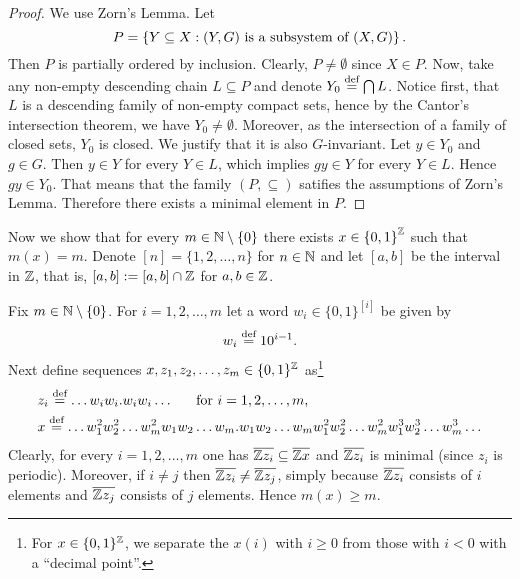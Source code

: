 \begin{proof}
We use Zorn's Lemma. Let $$P=\left\{Y\subseteq X: (Y,G) \text{ is a subsystem of } (X,G)\right\}.$$ Then $P$ is partially ordered by inclusion. Clearly, $P\neq\emptyset$ since $X\in P$. Now, take any non-empty descending chain $L\subseteq P$ and denote $Y_0\stackrel{\textup{def}}{=} \bigcap L$. Notice first, that $L$ is a descending family of non-empty compact sets, hence by the Cantor's intersection theorem, we have $Y_0\neq\emptyset$. Moreover, as the intersection of a family of closed sets, $Y_0$ is closed. We justify that it is also $G$-invariant. Let $y\in Y_0$ and $g\in G$. Then $y\in Y$ for every $Y\in L$, which implies $gy\in Y$ for every $Y\in L$. Hence $gy\in Y_0$.  That means that the family $(P,\subseteq)$ satifies the assumptions of Zorn's Lemma. Therefore there exists a minimal element in $P$.
\end{proof}



Now we show that for every $m\in \mathbb{N}\setminus\{0\}$ there exists $x\in \left\{0,1\right\}^{\mathbb{Z}}$ such that $m(x)=m$. Denote $[n]=\{1,2,\ldots,n\}$ for $n\in\mathbb{N}$ and let $[a,b]$ be the interval in $\mathbb{Z}$, that is, $[a,b]:=[a,b]\cap\mathbb{Z}$ for $a,b\in\mathbb{Z}$.  

Fix $m\in \mathbb{N}\setminus\{0\}$. 
For $i=1,2,\ldots,m$ let a word $w_i\in \{0,1\}^{[i]}$ be given by 
\[
w_i \stackrel{\textup{def}}{=} 10^{i-1}.
\]
Next define sequences $x,z_1,z_2,\ldots,z_m \in\{0,1\}^{\mathbb{Z}}$ as\footnote{For $x\in\{0,1\}^{\mathbb{Z}}$,  we separate the $x(i)$ with $i\geq 0$ from those with $i<0$ with a ``decimal point''.}
\begin{align*}
& z_i\stackrel{\textup{def}}{=} \ldots w_iw_i.w_iw_i\ldots  ~~~~\text{ for } i=1,2,\ldots,m, \\
& x\stackrel{\textup{def}}{=} \ldots w_1^2w_2^2\ldots w_m^2 w_1 w_2 \ldots w_m.w_1 w_2 \ldots w_m w_1^2w_2^2\ldots w_m^2 w_1^3 w_2^3 \ldots w_m^3 \ldots
\end{align*}
Clearly, for every $i=1,2,\ldots,m$ one has $\overline{\mathbb{Z} z_i}\subseteq\overline{\mathbb{Z} x}$ and $\overline{\mathbb{Z} z_i}$ is minimal (since $z_i$ is periodic). 
%
Moreover, if $i\neq j$ then $\overline{\mathbb{Z} z_i}\neq \overline{\mathbb{Z} z_j}$, simply because $\overline{\mathbb{Z} z_i}$ consists of $i$ elements and $\overline{\mathbb{Z} z_j}$ consists of $j$ elements. Hence $m(x) \geq m$.


